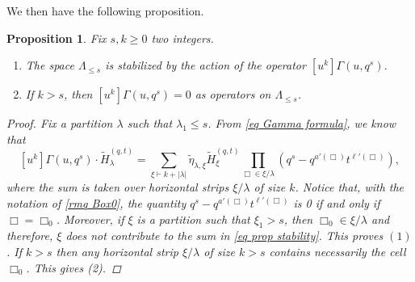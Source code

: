 \documentclass[12pt]{amsart}
\newtheorem{prop}[thm]{Proposition}
\theoremstyle{remark}
\newcommand{\tH}{\widetilde{H}^{(q,t)}}
\begin{document}
We then have the following proposition.
\begin{prop}\label{prop stability and vhanishing condition}
    Fix $s,k\geq 0$ two integers. 
    \begin{enumerate}[label={\normalfont(}\arabic*\normalfont)]
        \item The space $\Lambda_{\leq s}$ is stabilized by the action of the operator $[u^k]\Gamma(u,q^s)$.
        \item If $k>s$, then $[u^k]\Gamma(u,q^s)=0$ as operators on $\Lambda_{\leq s}$. 
    \end{enumerate} 
\begin{proof}
Fix a partition $\lambda$ such that $\lambda_1\leq s$.
From \cref{eq Gamma formula}, we know that 
\begin{equation}\label{eq prop stability}
  [u^k]\Gamma(u,q^s)\cdot \tH_\lambda=\sum_{\xi\vdash k+|\lambda|}\widetilde\eta_{\lambda,\xi}\tH_\xi\prod_{\Box\in\xi/ \lambda}\left(q^s-q^{a'(\Box)}t^{\ell'(\Box)}\right),  
\end{equation}
where the sum is taken over horizontal strips $\xi/\lambda$ of size $k$. Notice that, with the notation of \cref{rmq Box0}, the quantity $q^s-q^{a'(\Box)}t^{\ell'(\Box)}$ is 0 if and only if $\Box=\Box_0$. Moreover, if $\xi$ is a partition such that $\xi_1>s$, then $\Box_0\in\xi/\lambda$ and therefore, $\xi$ does not contribute to the sum in \cref{eq prop stability}. This proves $(1)$. If $k>s$ then any horizontal strip $\xi/\lambda$ of size $k>s$ contains necessarily the cell $\Box_0$. This gives (2).    
\end{proof}
\end{prop}
\end{document}
